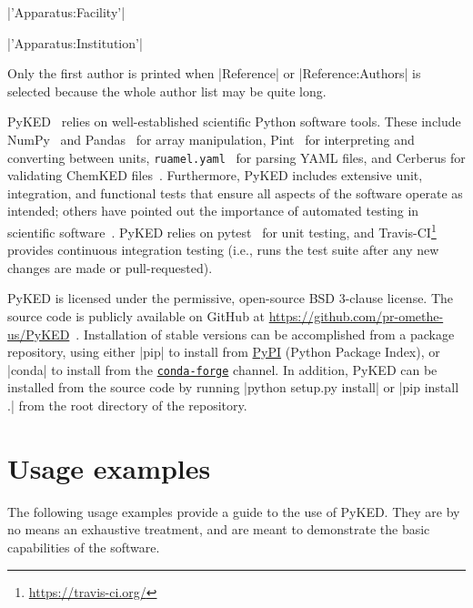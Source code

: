 \documentclass[12pt]{ijck}
\newcommand\ck{ChemKED}
\newcommand\pk{PyKED}
\begin{document}
\noindent\begin{itemize*}
    \item \pybox|'Apparatus:Facility'|
    \item \pybox|'Apparatus:Institution'|
\end{itemize*}

Only the first author is printed when \pybox|Reference| or
\pybox|Reference:Authors| is selected because the whole author list may be
quite long.

\pk{}~\autocite{PyKED} relies on well-established scientific Python software tools.
These include NumPy~\autocite{vanderWalt:2011np} and Pandas~\autocite{pandas,McKinney2010}
for array manipulation, Pint~\autocite{Grecco2016} for interpreting and converting
between units, \texttt{ruamel.yaml}~\autocite{ruamel_yaml} for parsing YAML
files, and Cerberus for validating \ck{} files~\autocite{cerberus}.
Furthermore, \pk{} includes extensive unit, integration, and functional tests
that ensure all aspects of the software operate as intended; others have pointed
out the importance of automated testing in scientific software~\autocite{Wilson:bestpractices}.
\pk{} relies on pytest~\autocite{pytest:3.0.1} for unit testing, and
Travis-CI\footnote{\url{https://travis-ci.org/}} provides continuous integration
testing (i.e., runs the test suite after any new changes are made or pull-requested).

\pk{} is licensed under the permissive, open-source BSD 3-clause license. The
source code is publicly available on GitHub at
\url{https://github.com/pr-omethe-us/PyKED}~\autocite{PyKED}. Installation of stable versions
can be accomplished from a package repository, using either \pybox|pip| to install
from \href{https://pypi.python.org/pypi}{PyPI} (Python Package Index), or
\pybox|conda| to install from the
\href{https://anaconda.org/conda-forge}{\texttt{conda-forge}} channel. In
addition, \pk{} can be installed from the source code by running
\pybox|python setup.py install| or \pybox|pip install .| from the root
directory of the repository.

\section{Usage examples}\label{sec:usage-example}

The following usage examples provide a guide to the use of \pk{}. They are by no
means an exhaustive treatment, and are meant to demonstrate the basic
capabilities of the software.
\end{document}
